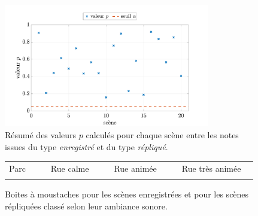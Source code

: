 \begin{figure}[ht]
\centering
\includegraphics[width = 0.8\textwidth]{./figures/test_perceptif/t-value-student.pdf}
\caption{Résumé des valeurs $p$ calculés pour chaque scène entre les notes issues du type \textit{enregistré} et du type \textit{répliqué}.}\label{fig:test-student}
\end{figure}

\begin{figure}[ht]
\centering
{}

\begin{tabular}{|p{1.5cm}|l|p{0.001cm}|p{2cm}|l|p{0.001cm}|p{2cm}|l|p{0.001cm}|p{2.75cm}|l|}
\hhline{|-|-|~|-|-|~|-|-|~|-|-|}
Parc & {\cellcolor[HTML]{5AB25A}} & & Rue calme & {\cellcolor[HTML]{FFCB2F}} & & Rue animée & {\cellcolor[HTML]{F56B00}} & &  Rue très animée & {\cellcolor[HTML]{9A0000}}\\
\hhline{|-|-|~|-|-|~|-|-|~|-|-|}
\end{tabular}

\caption{Boites à moustaches pour les scènes enregistrées   et pour les scènes répliquées  classé selon leur ambiance sonore.}

\label{fig:boxplot_scene}
\end{figure}

